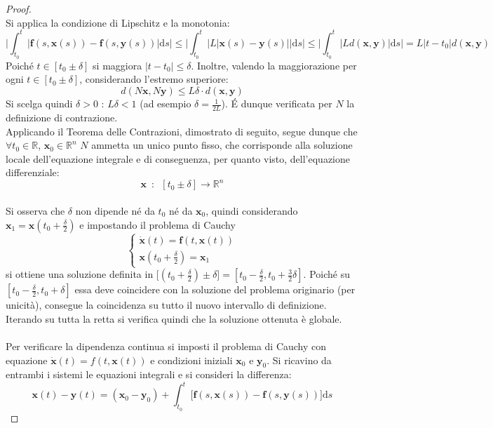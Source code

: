 \documentclass[10pt, oneside]{book}
\theoremstyle{plain}
\begin{document}
\begin{proof}
\\Si applica la condizione di Lipschitz e la monotonia:
\[\bigg|\int_{t_0}^{t}\big| \mathbf{f}(s, \mathbf{x}(s)) - \mathbf{f}(s, \mathbf{y}(s)) \big|\textrm{d}s\bigg| \leq \bigg|\int_{t_0}^{t}\big| L |\mathbf{x}(s) - \mathbf{y}(s)| \big|\textrm{d}s\bigg| \leq \bigg|\int_{t_0}^{t}\big| L d(\mathbf{x},\mathbf{y}) \big|\textrm{d}s\bigg| = L |t - t_0| d(\mathbf{x}, \mathbf{y})\]
Poiché $t \in [t_0 \pm \delta]$ si maggiora $|t-t_0| \leq \delta$. Inoltre, valendo la maggiorazione per ogni $t \in [t_0 \pm \delta]$, considerando l'estremo superiore:
\[d(N \mathbf{x}, N \mathbf{y}) \leq L \delta \cdot d(\mathbf{x}, \mathbf{y})\]
Si scelga quindi $\delta > 0$ : $L \delta < 1$ (ad esempio $\displaystyle \delta = \frac{1}{2L}$). \'E dunque verificata per $N$ la definizione di contrazione.
\\Applicando il Teorema delle Contrazioni, dimostrato di seguito, segue dunque che $\forall t_0 \in \mathbb{R}$, $\mathbf{x}_0 \in \mathbb{R}^n$ $N$ ammetta un unico punto fisso, che corrisponde alla soluzione locale dell'equazione integrale e di conseguenza, per quanto visto, dell'equazione differenziale:
\[\mathbf{x} \enspace : \enspace [t_0 \pm \delta] \longrightarrow \mathbb{R}^n\]
\\Si osserva che $\delta$ non dipende né da $t_0$ né da $\mathbf{x}_0$, quindi considerando $\displaystyle \mathbf{x}_1 = \mathbf{x}(t_0 + \frac{\delta}{2})$ e impostando il problema di Cauchy
\[\begin{cases}
\dot{\mathbf{x}}(t) = \mathbf{f}(t, \mathbf{x}(t))\\
\mathbf{x}(t_0 + \frac{\delta}{2}) = \mathbf{x}_1
\end{cases}\] 
si ottiene una soluzione definita in $\displaystyle \big[(t_0 + \frac{\delta}{2}) \pm \delta\big] = [t_0 - \frac{\delta}{2}, t_0 + \frac{3}{2}\delta]$. Poiché su $[t_0 - \frac{\delta}{2}, t_0 + \delta]$ essa deve coincidere con la soluzione del problema originario (per unicità), consegue la coincidenza su tutto il nuovo intervallo di definizione. Iterando su tutta la retta si verifica quindi che la soluzione ottenuta è globale.
\\~\\Per verificare la dipendenza continua si imposti il problema di Cauchy con equazione $\dot{\mathbf{x}}(t) = f(t, \mathbf{x}(t))$ e condizioni iniziali $\mathbf{x}_0$ e $\mathbf{y}_0$. Si ricavino da entrambi i sistemi le equazioni integrali e si consideri la differenza:
\[\mathbf{x}(t) - \mathbf{y}(t) = (\mathbf{x}_0 - \mathbf{y}_0) + \int_{t_0}^{t}\big[\mathbf{f}(s, \mathbf{x}(s)) - \mathbf{f}(s, \mathbf{y}(s))\big]\textrm{d}s\]

\end{proof}
\end{document}
